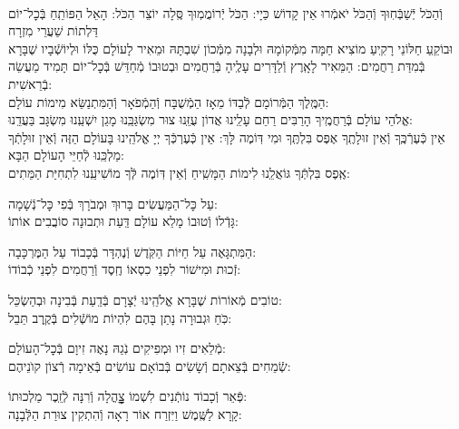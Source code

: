 \documentclass[twoside, openany, parskip=half, 11pt]{book}
\begin{document}
\\
\shatz {}
 וְֿהַכֹּל יְֿשַׁבְּֿחֽוּךָ וְֿהַכֹּל יֹאמְֿרוּ אֵין קָדוֹשׁ כַּיָי:\hfill \break
 \kahal הַכֹּל יְֿרוֹמֲמֽוּךָ סֶּֽלָה יוֹצֵר הַכֹּל: הָאֵל הַפּוֹתֵֽחַ בְּֿכׇל־יוֹם דַּלְתוֹת שַׁעֲרֵי מִזְרָח\\
 \shatz וּבוֹקֵֽעַ חַלּוֹנֵי רָקִֽיעַ מוֹצִיא חַמָּה מִמְּֿקוֹמָהּ וּלְבָנָה מִמְּֿכוֹן שִׁבְתָּהּ
 \kahal וּמֵאִיר לָעוֹלָם כֻּלּוֹ וּלְיוֹשְֿׁבָיו שֶׁבָּרָא בְּֿמִדַּת רַחֲמִים: \hfill \break
 \shatz הַמֵּאִיר לָאָֽרֶץ וְֿלַדָּרִים עָלֶֽיהָ בְּֿרַחֲמִים וּבְטוּבוֹ מְֿחַדֵּשׁ בְּֿכׇל־יוֹם תָּמִיד מַעֲשֵׂה בְֿרֵאשִׁית: \\
 \kahal הַמֶּֽלֶךְ הַמְּֿרוֹמָם לְֿבַדּוֹ מֵאָז הַמְֿשֻׁבָּח וְֿהַמְֿפֹאָר וְֿהַמִּתְנַשֵּׂא מִימוֹת עוֹלָם: \\
 \shatz אֱלֹהֵי עוֹלָם בְּֿרַחֲמֶֽיךָ הָרַבִּים רַחֵם עָלֵֽינוּ אֲדוֹן עֻזֵּֽנוּ צוּר מִשְׂגַּבֵּֽנוּ מָגֵן יִשְׁעֵֽנוּ מִשְׂגָּב בַּעֲדֵֽנוּ: \\
 \kahal אֵין כְּֿעֶרְֿכֶּֽךָ וְֿאֵין זוּלָתֶֽךָ אֶפֶס בִּלְתֶּֽךָ וּמִי דּֽוֹמֶה לָּךְ: \hfill \break
 \shatz אֵין כְּֿעֶרְכְּֿךָ יְיָ אֱלֹהֵֽינוּ בָּעוֹלָם הַזֶּה וְֿאֵין זוּלָתְֿךָ מַלְכֵּֽנוּ לְֿחַיֵּי הָעוֹלָם הַבָּא:\\
 \kahal אֶֽפֶס בִּלְתְּֿךָ גּוֹאֲלֵֽנוּ לִימוֹת הַמָּשִֽׁיחַ וְֿאֵין דּֽוֹמֶה לְּֿךָ מוֹשִׁיעֵֽנוּ לִתְחִיַּת הַמֵּתִים:

\shatz {}
 עַל כׇּל־הַמַּעֲשִׂים \hfill בָּרוּךְ וּמְבֹרָךְ בְּֿפִי כׇּל־נְֿשָׁמָה: \\
\kahal גָּדְֿלוֹ וְֿטוּבוֹ מָלֵא עוֹלָם \hfill דַּֽעַת וּתְבוּנָה סוֹבֲבִים אוֹתוֹ:

\shatz הַמִּתְגָּאֶה עַל חַיּוֹת הַקֹּֽדֶשׁ \hfill וְֿנֶהְדָּר בְּֿכָבוֹד עַל הַמֶּרְכָּבָה:\\
\kahal זְֿכוּת וּמִישׁוֹר לִפְנֵי כִסְאוֹ \hfill חֶֽסֶד וְֿרַחֲמִים לִפְנֵי כְֿבוֹדוֹ:

\shatz טוֹבִים מְֿאוֹרוֹת שֶׁבָּרָא אֱלֹהֵֽינוּ \hfill יְֿצָרָם בְּֿדַֽעַת בְּֿבִינָה וּבְהַשְׂכֵּל:\\
\kahal כֹּֽחַ וּגְבוּרָה נָתַן בָּהֶם \hfill לִהְיוֹת מוֹשְֿׁלִים בְּֿקֶֽרֶב תֵּבֵל:

\shatz מְֿלֵאִים זִיו וּמְפִיקִים נֹֽגַהּ \hfill נָאֶה זִיוָם בְּֿכׇל־הָעוֹלָם: \\
\kahal שְֿׂמֵחִים בְּֿצֵאתָם וְֿשָׂשִׂים בְּֿבוֹאָם \hfill עוֹשִׂים בְּֿאֵימָה רְֿצוֹן קוׂנֵיהֶם:

\shatz פְּֿאֵר וְֿכָבוֹד נוֹתְֿנִים לִשְׁמוֹ \hfill צׇׇׇׇׇׇׇׇָהֳלָה וְֿרִנָּה לְֿזֵֽכֶר מַלְכוּתוֹ: \\
\kahal קָרָא לַשֶּֽׁמֶשׁ וַיִּזְרַח אוֹר \hfill רָאָה וְֿהִתְקִין צוּרַת הַלְּֿבָנָה:
\end{document}
